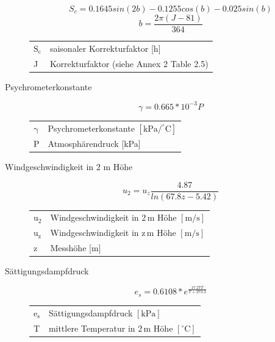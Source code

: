 \begin{description}
\begin{equation}
\label{eq:s_c}
S_c=0.1645sin(2b)-0.1255cos(b)-0.025sin(b)
\end{equation}
\begin{equation}
b=\frac{2\pi(J-81)}{364}
\end{equation}
\begin{table}[H]
\centering
\begin{tabular}{ll}
$\mathrm{S_c}$ & saisonaler Korrekturfaktor [h]\\
J & Korrekturfaktor (siehe \cite{fao} Annex 2 Table 2.5)\\
\end{tabular}
\end{table}




\item[Psychrometerkonstante]
\begin{equation}
\label{eq:gamma}
\gamma=0.665*10^{-3} P
\end{equation}
\begin{table}[H]
\centering
\begin{tabular}{ll}
$\mathrm{\gamma}$ & Psychrometerkonstante $\mathrm{[kPa/^{\circ}C]}$\\
P & Atmosphärendruck [kPa]\\
\end{tabular}
\end{table}

\item[Windgeschwindigkeit in 2 m Höhe]
\begin{equation}
\label{eq:u2}
u_2=u_z\frac{4.87}{ln(67.8z-5.42)}
\end{equation}
\begin{table}[H]
\centering
\begin{tabular}{ll}
$\mathrm{u_2}$ & Windgeschwindigkeit in 2\,m Höhe $\mathrm{[m/s]}$\\
$\mathrm{u_z}$ & Windgeschwindigkeit in z\,m Höhe $\mathrm{[m/s]}$\\
z & Messhöhe [m]\\
\end{tabular}
\end{table}

\item[Sättigungsdampfdruck]
\begin{equation}
\label{eq:es}
e_s=0.6108*e^{\frac{17.27T}{T+273.3}}
\end{equation}
\begin{table}[H]
\centering
\begin{tabular}{ll}
$\mathrm{e_s}$ & Sättigungsdampfdruck $\mathrm{[kPa]}$\\
T & mittlere Temperatur in 2\,m Höhe $\mathrm{[^{\circ}C]}$\\\end{tabular}
\end{table}

\end{description}


